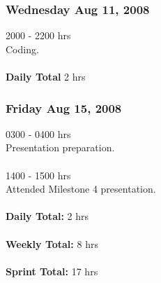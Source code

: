 \documentclass[10pt, a4]{article}
\begin{document}
\subsubsection*{Wednesday Aug 11, 2008}
2000 - 2200 hrs\\
Coding.\\
\\
\textbf{Daily Total} 2 hrs\\

\subsubsection*{Friday Aug 15, 2008}
0300 - 0400 hrs\\
Presentation preparation.\\
\\
1400 - 1500 hrs\\
Attended Milestone 4 presentation.\\
\\
\textbf{Daily Total:} 2 hrs\\
\\
\textbf{Weekly Total:} 8 hrs\\
\\
\textbf{Sprint Total:} 17 hrs%
\end{document}
